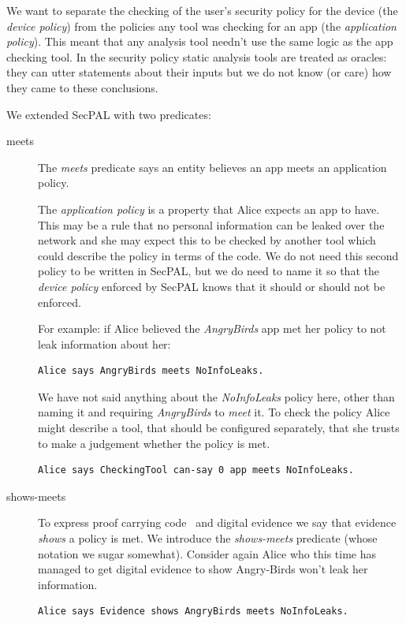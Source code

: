 \documentclass[a4paper,sfsidenotes]{%
  scrartcl%
}
\begin{document}
We want to separate the checking of the user's security policy for the device
(the \emph{device policy}) from the policies any tool was checking for an app
(the \emph{application policy}).  This meant that any analysis tool needn't use
the same logic as the app checking tool.  In the security policy static analysis
tools are treated as oracles: they can utter statements about their inputs but
we do not know (or care) how they came to these conclusions.

We extended SecPAL with two predicates:  

\begin{description}
  \item[\ttfamily meets] 
The \emph{meets} predicate says an
entity believes an app meets an application policy. 

The \emph{application policy} is a property that Alice expects an app to have.
This may be a rule that no personal information can be leaked over the network
and she may expect this to be checked by another tool which could describe the
policy in terms of the code.  We do not need this second policy to be written in
SecPAL, but we do need to name it so that the \emph{device policy} enforced by
SecPAL knows that it should or should not be enforced.

For example: if Alice believed the \emph{AngryBirds} app met her policy to not
leak information about her:

\begin{lstlisting}[language=SecPAL]
Alice says AngryBirds meets NoInfoLeaks.
\end{lstlisting}

We have not said anything about the \emph{NoInfoLeaks} policy here, other than
naming it and requiring \emph{AngryBirds} to \emph{meet} it.  To check the
policy Alice might describe a tool, that should be configured separately, that
she trusts to make a judgement whether the policy is met.

\begin{lstlisting}[language=SecPAL]
Alice says CheckingTool can-say 0 app meets NoInfoLeaks.
\end{lstlisting}

\item[\ttfamily shows-meets]
To express proof carrying code~\cite{Necula:1996tr} and digital
evidence we say that evidence \emph{shows} a policy is met.  
We introduce the \emph{shows-meets} predicate (whose notation we sugar
somewhat).  Consider again Alice who this time has managed to get
digital evidence to show Angry-Birds won't leak her information.

\begin{lstlisting}[language=SecPAL]
Alice says Evidence shows AngryBirds meets NoInfoLeaks.
\end{lstlisting}
\end{description}
\end{document}
